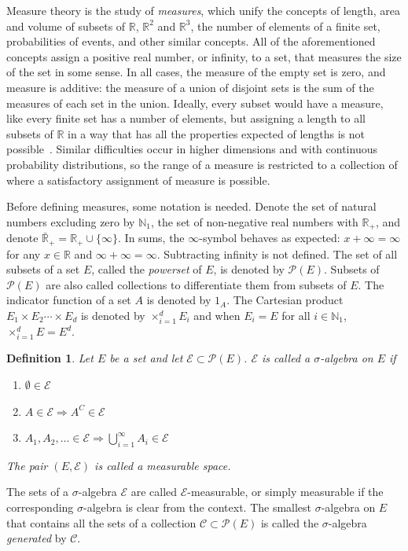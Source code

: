 \documentclass[english,twoside,openright]{HYgraduMLDS}
\newtheorem{definition}[lemma]{Definition}
\newcommand{\R}{\mathbb{R}}
\newcommand{\N}{\mathbb{N}}
\DeclareMathOperator*{\bigtimes}{\times}
\begin{document}
Measure theory is the study of \emph{measures}, which unify the concepts
of length, area and volume of subsets of \(\R\), \(\R^{2}\) and
\(\R^{3}\), the number of elements of a finite set, probabilities of events,
and other similar
concepts. All of the aforementioned concepts assign a positive real number,
or infinity, to a set, that measures the size of the set in some sense.
In all cases, the measure of the empty set is zero, and measure is
additive: the measure of a union of disjoint sets is the sum of the measures
of each set in the union. Ideally, every subset would have a measure, like
every finite set has a number of elements, but assigning a
length to all subsets of \(\R\) in a way that has all the properties expected
of lengths
is not possible~\cite{Cin11}. Similar difficulties occur in higher dimensions and with
continuous probability distributions, so the range of a measure is
restricted to a collection of where a satisfactory assignment of measure is
possible.

Before defining measures, some notation is needed. Denote the set of
natural numbers excluding zero by \(\N_{1}\), the set of
non-negative real numbers with \(\R_{+}\), and denote
\(\bar{\R}_{+} = \R_{+}\cup \{\infty\}\). In sums, the \(\infty\)-symbol
behaves as expected: \(x + \infty = \infty\) for any \(x\in \R\) and
\(\infty + \infty = \infty\). Subtracting infinity is not defined.
The set of all subsets of a set \(E\), called
the \emph{powerset} of \(E\), is denoted by \(\mathcal{P}(E)\).
Subsets of \(\mathcal{P}(E)\) are also called collections to
differentiate them from subsets of \(E\).
The indicator function of a set \(A\) is denoted by \(1_{A}\).
The Cartesian product \(E_{1}\times E_{2}\dotsb \times E_{d}\)
is denoted by \(\bigtimes_{i=1}^{d}E_{i}\) and when \(E_{i} = E\) for
all \(i\in \N_{1}\), \(\bigtimes_{i=1}^{d}E = E^{d}\).

\begin{definition}
  Let \(E\) be a set and let \(\mathcal{E}\subset \mathcal{P}(E)\).
  \(\mathcal{E}\) is called a \(\sigma\)-algebra on \(E\) if
  \begin{enumerate}
    \item \(\emptyset \in \mathcal{E}\)
    \item \(A\in \mathcal{E}\Rightarrow A^{C}\in \mathcal{E}\)
    \item \(A_{1},A_{2},\dotsc \in \mathcal{E}
          \Rightarrow \bigcup_{i=1}^{\infty} A_{i}\in \mathcal{E}\)
  \end{enumerate}
  The pair \((E, \mathcal{E})\) is called a measurable space.
\end{definition}
The sets of a \(\sigma\)-algebra \(\mathcal{E}\) are called
\(\mathcal{E}\)-measurable, or simply measurable if the corresponding
\(\sigma\)-algebra is clear from the context. The smallest \(\sigma\)-algebra
on \(E\) that contains all the sets of a collection
\(\mathcal{C}\subset \mathcal{P}(E)\) is called the \(\sigma\)-algebra
\emph{generated} by \(\mathcal{C}\).
\end{document}
